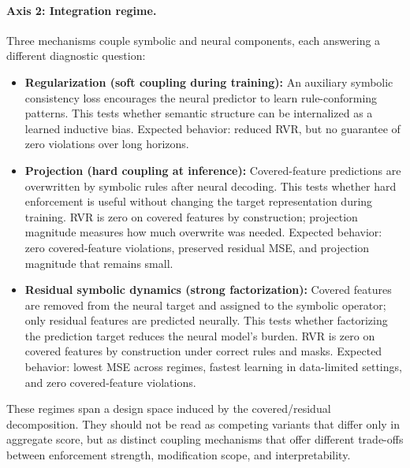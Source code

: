 \documentclass{article}
\theoremstyle{plain}
\theoremstyle{definition}
\theoremstyle{remark}
\begin{document}
\paragraph{Axis 2: Integration regime.}
Three mechanisms couple symbolic and neural components, each answering a different diagnostic question:
\begin{itemize}
  \item \textbf{Regularization (soft coupling during training):} An auxiliary symbolic consistency loss encourages the neural predictor to learn rule-conforming patterns. This tests whether semantic structure can be internalized as a learned inductive bias. Expected behavior: reduced RVR, but no guarantee of zero violations over long horizons.
  \item \textbf{Projection (hard coupling at inference):} Covered-feature predictions are overwritten by symbolic rules after neural decoding. This tests whether hard enforcement is useful without changing the target representation during training. RVR is zero on covered features by construction; projection magnitude measures how much overwrite was needed. Expected behavior: zero covered-feature violations, preserved residual MSE, and projection magnitude that remains small.
  \item \textbf{Residual symbolic dynamics (strong factorization):} Covered features are removed from the neural target and assigned to the symbolic operator; only residual features are predicted neurally. This tests whether factorizing the prediction target reduces the neural model's burden. RVR is zero on covered features by construction under correct rules and masks. Expected behavior: lowest MSE across regimes, fastest learning in data-limited settings, and zero covered-feature violations.
\end{itemize}

These regimes span a design space induced by the covered/residual decomposition. They should not be read as competing variants that differ only in aggregate score, but as distinct coupling mechanisms that offer different trade-offs between enforcement strength, modification scope, and interpretability.
\end{document}
